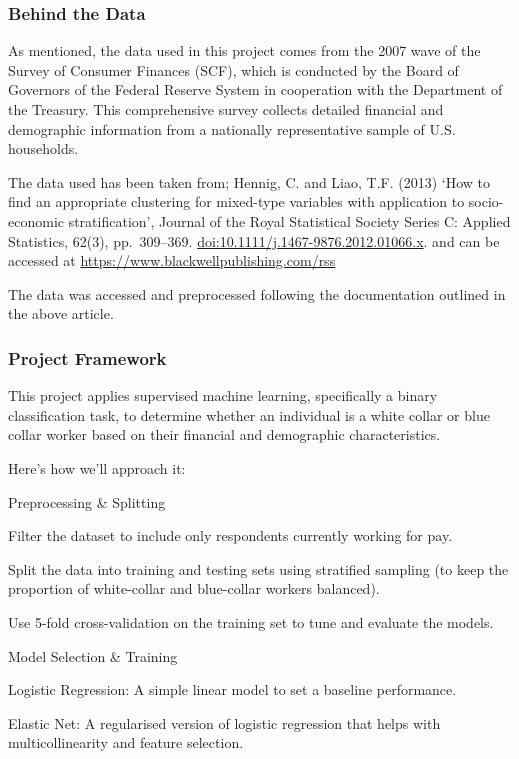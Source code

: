 \documentclass[
]{article}
\begin{document}
\subsubsection{Behind the Data}\label{behind-the-data}

As mentioned, the data used in this project comes from the 2007 wave of
the Survey of Consumer Finances (SCF), which is conducted by the Board
of Governors of the Federal Reserve System in cooperation with the
Department of the Treasury. This comprehensive survey collects detailed
financial and demographic information from a nationally representative
sample of U.S. households.

The data used has been taken from; Hennig, C. and Liao, T.F. (2013) `How
to find an appropriate clustering for mixed-type variables with
application to socio-economic stratification', Journal of the Royal
Statistical Society Series C: Applied Statistics, 62(3), pp.~309--369.
\url{doi:10.1111/j.1467-9876.2012.01066.x}. and can be accessed at
\url{https://www.blackwellpublishing.com/rss}

The data was accessed and preprocessed following the documentation
outlined in the above article.

\subsubsection{Project Framework}\label{project-framework}

This project applies supervised machine learning, specifically a binary
classification task, to determine whether an individual is a white
collar or blue collar worker based on their financial and demographic
characteristics.

Here's how we'll approach it:

Preprocessing \& Splitting

Filter the dataset to include only respondents currently working for
pay.

Split the data into training and testing sets using stratified sampling
(to keep the proportion of white-collar and blue-collar workers
balanced).

Use 5-fold cross-validation on the training set to tune and evaluate the
models.

Model Selection \& Training

Logistic Regression: A simple linear model to set a baseline
performance.

Elastic Net: A regularised version of logistic regression that helps
with multicollinearity and feature selection.
\end{document}
